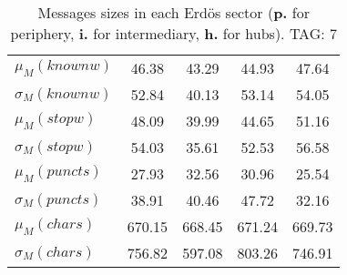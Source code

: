 \begin{table}[h!]
\begin{center}
\begin{tabular}{| l || c | c | c | c |}
$\mu_M(knownw)$ & 46.38  & 43.29  & 44.93  & 47.64 \\
$\sigma_M(knownw)$ & 52.84  & 40.13  & 53.14  & 54.05 \\\hline
$\mu_M(stopw)$ & 48.09  & 39.99  & 44.65  & 51.16 \\
$\sigma_M(stopw)$ & 54.03  & 35.61  & 52.53  & 56.58 \\\hline
$\mu_M(puncts)$ & 27.93  & 32.56  & 30.96  & 25.54 \\
$\sigma_M(puncts)$ & 38.91  & 40.46  & 47.72  & 32.16 \\\hline
$\mu_M(chars)$ & 670.15  & 668.45  & 671.24  & 669.73 \\
$\sigma_M(chars)$ & 756.82  & 597.08  & 803.26  & 746.91 \\\hline
\end{tabular}
\caption{Messages sizes in each Erd\"os sector ({{\bf p.}} for periphery, {{\bf i.}} for intermediary, {{\bf h.}} for hubs). TAG: 7}
\end{center}
\end{table}